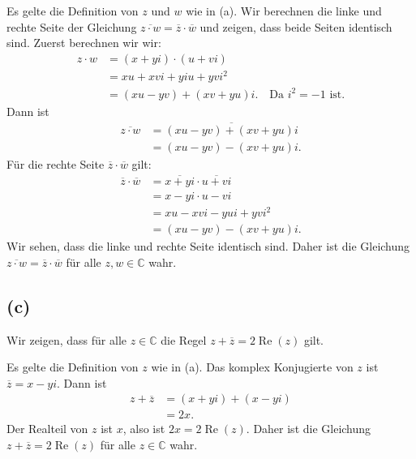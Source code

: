 \documentclass{article}
\theoremstyle{definition}
\theoremstyle{remark}
\begin{document}
\proof Es gelte die Definition von \( z \) und \( w \) wie in (a). Wir berechnen die linke und rechte Seite der Gleichung \( \overline{z \cdot w} = \overline{z} \cdot \overline{w} \) und zeigen, dass beide Seiten identisch sind.
Zuerst berechnen wir wir:
\begin{align*}
	z \cdot w & = (x + yi) \cdot (u + vi)                                        \\
	          & = xu + xvi + yiu + yvi^2                                         \\
	          & = (xu - yv) + (xv + yu)i. \quad \text{Da } i^2 = -1 \text{ ist.}
\end{align*}
Dann ist
\begin{align*}
	\overline{z \cdot w} & = \overline{(xu - yv) + (xv + yu)i} \\
	                     & = (xu - yv) - (xv + yu)i.
\end{align*}
Für die rechte Seite \( \overline{z} \cdot \overline{w} \) gilt:
\begin{align*}
	\overline{z} \cdot \overline{w} & = \overline{x + yi} \cdot \overline{u + vi} \\
	                                & = x - yi \cdot u - vi                       \\
	                                & = xu - xvi - yui + yvi^2                    \\
	                                & = (xu - yv) - (xv + yu)i.
\end{align*}
Wir sehen, dass die linke und rechte Seite identisch sind. Daher ist die Gleichung \( \overline{z \cdot w} = \overline{z} \cdot \overline{w} \) für alle \( z, w \in \mathbb{C} \) wahr.
\endproof

\subsection*{(c)}
Wir zeigen, dass für alle \( z \in \mathbb{C} \) die Regel \( z + \overline{z} = 2 \operatorname{Re}(z) \) gilt.

\proof Es gelte die Definition von \( z \) wie in (a).
Das komplex Konjugierte von \( z \) ist \( \overline{z} = x - yi \). Dann ist
\begin{align*}
	z + \overline{z} & = (x + yi) + (x - yi) \\
	                 & = 2x.
\end{align*}
Der Realteil von \( z \) ist \( x \), also ist \( 2x = 2 \operatorname{Re}(z) \). Daher ist die Gleichung \( z + \overline{z} = 2 \operatorname{Re}(z) \) für alle \( z \in \mathbb{C} \) wahr.
\endproof
\end{document}
